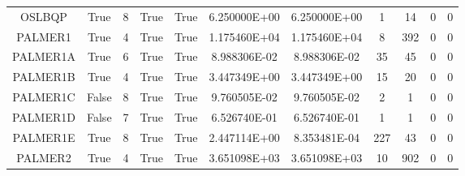 \begin{longtable}{ccccccccccc}
	\cellcolor{default2} OSLBQP& \cellcolor{default2} True& \cellcolor{default2} 8& \cellcolor{default2} True& \cellcolor{default2} True& \cellcolor{best} 6.250000E+00& \cellcolor{best} 6.250000E+00& \cellcolor{best} 1& \cellcolor{poor} 14& \cellcolor{default2} 0& \cellcolor{default2} 0\\
	\cellcolor{default1} PALMER1& \cellcolor{default1} True& \cellcolor{default1} 4& \cellcolor{default1} True& \cellcolor{default1} True& \cellcolor{ok} 1.175460E+04& \cellcolor{best} 1.175460E+04& \cellcolor{best} 8& \cellcolor{poor} 392& \cellcolor{default1} 0& \cellcolor{default1} 0\\
	\cellcolor{default2} PALMER1A& \cellcolor{default2} True& \cellcolor{default2} 6& \cellcolor{default2} True& \cellcolor{default2} True& \cellcolor{best} 8.988306E-02& \cellcolor{ok} 8.988306E-02& \cellcolor{best} 35& \cellcolor{ok} 45& \cellcolor{default2} 0& \cellcolor{default2} 0\\
	\cellcolor{default1} PALMER1B& \cellcolor{default1} True& \cellcolor{default1} 4& \cellcolor{default1} True& \cellcolor{default1} True& \cellcolor{ok} 3.447349E+00& \cellcolor{best} 3.447349E+00& \cellcolor{best} 15& \cellcolor{ok} 20& \cellcolor{default1} 0& \cellcolor{default1} 0\\
	\cellcolor{default2} PALMER1C& \cellcolor{default2} False& \cellcolor{default2} 8& \cellcolor{default2} True& \cellcolor{default2} True& \cellcolor{best} 9.760505E-02& \cellcolor{ok} 9.760505E-02& \cellcolor{ok} 2& \cellcolor{best} 1& \cellcolor{default2} 0& \cellcolor{default2} 0\\
	\cellcolor{default1} PALMER1D& \cellcolor{default1} False& \cellcolor{default1} 7& \cellcolor{default1} True& \cellcolor{default1} True& \cellcolor{best} 6.526740E-01& \cellcolor{ok} 6.526740E-01& \cellcolor{best} 1& \cellcolor{best} 1& \cellcolor{default1} 0& \cellcolor{default1} 0\\
	\cellcolor{default2} PALMER1E& \cellcolor{default2} True& \cellcolor{default2} 8& \cellcolor{default2} True& \cellcolor{default2} True& \cellcolor{poor} 2.447114E+00& \cellcolor{best} 8.353481E-04& \cellcolor{poor} 227& \cellcolor{best} 43& \cellcolor{default2} 0& \cellcolor{default2} 0\\
	\cellcolor{default1} PALMER2& \cellcolor{default1} True& \cellcolor{default1} 4& \cellcolor{default1} True& \cellcolor{default1} True& \cellcolor{best} 3.651098E+03& \cellcolor{ok} 3.651098E+03& \cellcolor{best} 10& \cellcolor{poor} 902& \cellcolor{default1} 0& \cellcolor{default1} 0\\

\end{longtable}
